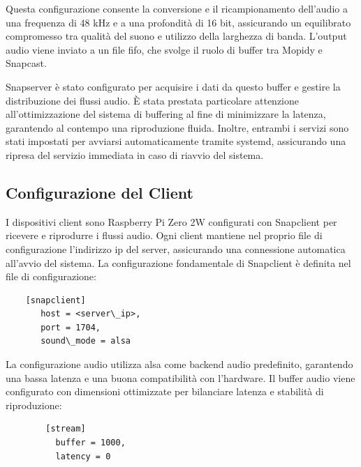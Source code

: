 Questa configurazione consente la conversione e il ricampionamento dell'audio a una frequenza di 48 kHz e a una profondità di 16 bit, assicurando un equilibrato compromesso tra qualità del suono e utilizzo della larghezza di banda. L'output audio viene inviato a un file \gls{fifo}, che svolge il ruolo di buffer tra Mopidy e Snapcast.

Snapserver è stato configurato per acquisire i dati da questo buffer e gestire la distribuzione dei flussi audio. È stata prestata particolare attenzione all'ottimizzazione del sistema di buffering al fine di minimizzare la latenza, garantendo al contempo una riproduzione fluida. Inoltre, entrambi i servizi sono stati impostati per avviarsi automaticamente tramite systemd, assicurando una ripresa del servizio immediata in caso di riavvio del sistema.

\subsection{Configurazione del Client}

I dispositivi client sono Raspberry Pi Zero 2W configurati con Snapclient per ricevere e riprodurre i flussi audio. Ogni client mantiene nel proprio file di configurazione l'indirizzo \gls{ip} del server, assicurando una connessione automatica all'avvio del sistema. La configurazione fondamentale di Snapclient è definita nel file di configurazione:

\begin{table}[H]
\begin{algorithm}[H]
  \caption{}
  \BlankLine
  \begin{verbatim}
    [snapclient]
       host = <server\_ip>,
       port = 1704,
       sound\_mode = alsa
  \end{verbatim}
\end{algorithm}
\caption{Configurazione base del client Snapclient}
\end{table}

La configurazione audio utilizza \gls{alsa} come backend audio predefinito, garantendo una bassa latenza e una buona compatibilità con l'hardware. Il buffer audio viene configurato con dimensioni ottimizzate per bilanciare latenza e stabilità di riproduzione:

\begin{table}[H]
  \begin{algorithm}[H]
    \caption{}
    \BlankLine
    \begin{verbatim}
        [stream]
          buffer = 1000,
          latency = 0
    \end{verbatim}
  \end{algorithm}
  \caption{Configurazione del buffer audio di Snapclient.}
\end{table}

